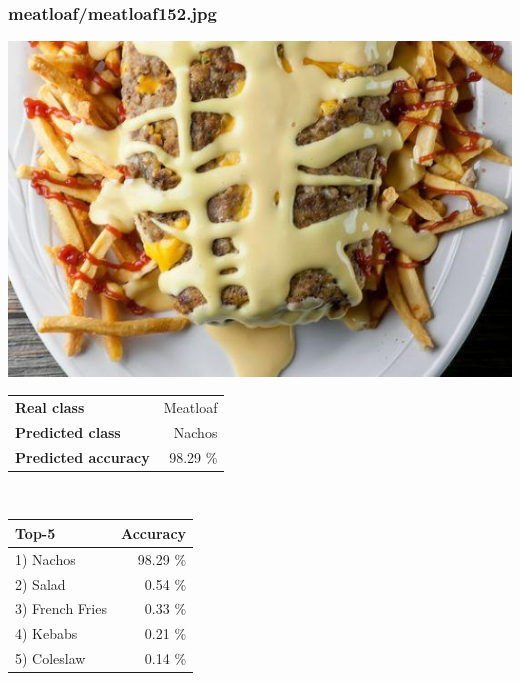 \subsubsection{meatloaf/meatloaf152.jpg}

\begin{minipage}[t]{0.4\textwidth}
	\vspace{0pt}
	\includegraphics[width=\linewidth]{images/evaluation-images/meatloaf/meatloaf152.jpg}
\end{minipage}
\hfill
\begin{minipage}[t]{0.5\textwidth}
	\vspace{0pt}\raggedright
	\begin{tabularx}{\textwidth}{X r}
		\small \textbf{Real class} & \small Meatloaf\\
		\small \textbf{Predicted class} & \small Nachos\\
		\small \textbf{Predicted accuracy} & \small 98.29 \%
    \end{tabularx}\\
    
    \vspace{6pt}
	\begin{tabularx}{\textwidth}{X r}
        \small \textbf{Top-5} & \small \textbf{Accuracy} \\
        \hline
		\small 1) Nachos & \small 98.29 \%\\\small 2) Salad & \small 0.54 \%\\\small 3) French Fries & \small 0.33 \%\\\small 4) Kebabs & \small 0.21 \%\\\small 5) Coleslaw & \small 0.14 \%
    \end{tabularx}
\end{minipage}
    
